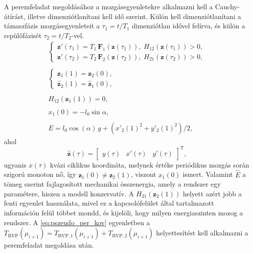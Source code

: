 A peremfeladat megoldásához a mozgásegyenletekre alkalmazni kell a Cauchy-átírást, illetve dimenziótlanítani kell idő szerint.
Külön kell dimenziótlanítani a támaszfázis mozgásegyenleteit a $\tau_1 = t/T_1$ dimenziótlan idővel felírva, és külön a repülőfázisét $\tau_2 = t/T_2$-vel.
\begin{equation}
\begin{matrix}
\begin{cases}
\mathbf{z}'(\tau_1) = T_1\,\mathbf{F}_1(\mathbf{z}(\tau_1)), \; H_{12}(\mathbf{z}(\tau_1)) > 0, \\
\mathbf{z}'(\tau_2) = T_2\,\mathbf{F}_2(\mathbf{z}(\tau_2)), \; H_{21}(\mathbf{z}(\tau_2)) > 0,
\end{cases} \\\\
\begin{cases}
\mathbf{z}_1(1) = \mathbf{z}_2(0), \\
\hat{\mathbf{z}}_2(1) = \hat{\mathbf{z}}_1(0),
\end{cases} \\\\
H_{12}(\mathbf{z}_1(1)) = 0,
 \\\\
x_1(0) = -l_0\sin{\alpha},
\\\\
\hat{E} = l_0\cos(\alpha)\,g + \left(x'_2(1)^2 + y'_2(1)^2\right)/2,
\end{matrix}
\end{equation}
ahol
\begin{equation}
	\hat{\mathbf{z}}(\tau) = 
	\begin{bmatrix}
		y(\tau) & x'(\tau) & y'(\tau)
	\end{bmatrix}^\mathrm{T},
\end{equation}
ugyanis $x(\tau)$ kvázi ciklikus koordináta, melynek értéke periódikus mozgás során szigorú monoton nő, így $\mathbf{z}_1(0)\neq\mathbf{z}_2(1)$, viszont $x_1(0)$ ismert.
Valamint $\hat{E}$ a tömeg szerint fajlagosított mechanikai összenergia, amely a rendszer egy paramétere, hiszen a modell konzervatív.
A $H_{21}(\mathbf{z}_2(1))$ helyett azért jobb a fenti egyenlet használata, mivel ez a kapcsolófelület által tartalmazott információn felül többet mondd, és kijelöli, hogy milyen energiaszinten mozog a rendszer.
A \eqref{eq:pszeudo_per_kov} egyenletben a $T_{\mathrm{BVP}}(\mu_{i+1}) = T_{\mathrm{BVP,1}}(\mu_{i+1}) + T_{\mathrm{BVP,2}}(\mu_{i+1})$ helyettesítést kell alkalmazni a peremfeladat megoldása után.

